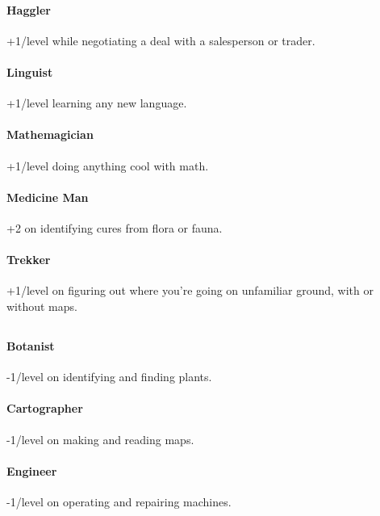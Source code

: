 \paragraph{Haggler}
\hypertarget{SkillHaggler}{}
+1/level while negotiating a deal with a salesperson or trader.

\paragraph{Linguist}
\hypertarget{SkillLinguist}{}
+1/level learning any new language.

\paragraph{Mathemagician}
\hypertarget{SkillMathemagician}{}
+1/level doing anything cool with math.

\paragraph{Medicine Man}
\hypertarget{SkillMedicineMan}{}
+2 on identifying cures from flora or fauna.

\paragraph{Trekker}
\hypertarget{SkillTrekker}{}
+1/level on figuring out where you're going on unfamiliar ground, with or without maps.

\subsection{\lasersC}
\hypertarget{skillsLasers}{}

\paragraph{Botanist}
\hypertarget{SkillBotanist}{}
-1/level on identifying and finding plants.

\paragraph{Cartographer}
\hypertarget{SkillCartographer}{}
-1/level on making and reading maps.

\paragraph{Engineer}
\hypertarget{SkillEngineer}{}
-1/level on operating and repairing machines.

